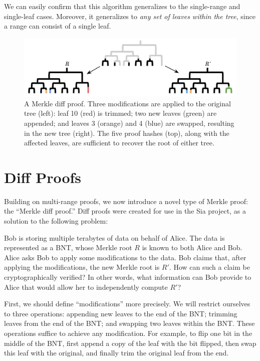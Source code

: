 \documentclass[twocolumn]{article}
\begin{document}
We can easily confirm that this algorithm generalizes to the single-range and single-leaf cases. Moreover, it generalizes to \textit{any set of leaves within the tree}, since a range can consist of a single leaf.



\begin{figure}[t]
\includegraphics[scale=0.38]{diff}
\centering
\setlength{\belowcaptionskip}{-12pt}
\caption{A Merkle diff proof. Three modifications are applied to the original tree (left): leaf 10 (red) is trimmed; two new leaves (green) are appended; and leaves 3 (orange) and 4 (blue) are swapped, resulting in the new tree (right). The five proof hashes (top), along with the affected leaves, are sufficient to recover the root of either tree.}
\label{img-diff}
\end{figure}


\section{Diff Proofs}

Building on multi-range proofs, we now introduce a novel type of Merkle proof: the ``Merkle diff proof.'' Diff proofs were created for use in the Sia project, as a solution to the following problem:

Bob is storing multiple terabytes of data on behalf of Alice. The data is represented as a BNT, whose Merkle root $R$ is known to both Alice and Bob. Alice asks Bob to apply some modifications to the data. Bob claims that, after applying the modifications, the new Merkle root is $R'$. How can such a claim be cryptographically verified? In other words, what information can Bob provide to Alice that would allow her to independently compute $R'$?

First, we should define ``modifications'' more precisely. We will restrict ourselves to three operations: appending new leaves to the end of the BNT; trimming leaves from the end of the BNT; and swapping two leaves within the BNT. These operations suffice to achieve any modification. For example, to flip one bit in the middle of the BNT, first append a copy of the leaf with the bit flipped, then swap this leaf with the original, and finally trim the original leaf from the end.
\end{document}
